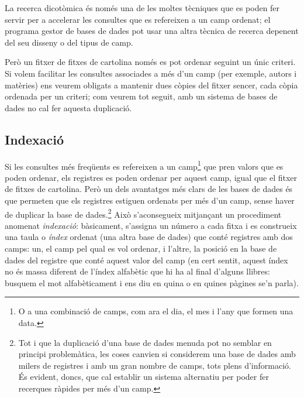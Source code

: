 La recerca dicotòmica és només una de les moltes tècniques que es
poden fer servir per a accelerar les consultes que es refereixen a un
camp ordenat; el programa gestor de bases de dades pot usar una altra
tècnica de recerca depenent del seu disseny o del tipus de camp.

Però un fitxer de fitxes de cartolina només es pot ordenar seguint un
únic criteri. Si volem facilitar les consultes associades a més d'un
camp (per exemple, autors i matèries) ens veurem obligats a mantenir
dues còpies del fitxer sencer, cada còpia ordenada per un criteri; com
veurem tot seguit, amb un sistema de bases de dades no cal fer aquesta
duplicació.

\subsection{Indexació}

Si les consultes més freqüents es refereixen a un camp\footnote{O a
  una combinació de camps, com ara el dia, el mes i l'any que formen
  una data.} que pren valors que es poden ordenar, els registres es
poden ordenar per aquest camp, igual que el fitxer de fitxes de
cartolina. Però un dels avantatges més clars de les bases de dades és
que permeten que els registres estiguen ordenats per més d'un camp,
sense haver de duplicar la base de dades.\footnote{
  
  Tot i que la duplicació d'una 
  base de dades menuda pot no semblar en principi problemàtica,
  les coses canvien si considerem una base de dades amb milers de
  registres i amb un gran nombre de camps, tots plens d'informació. 
  És evident, doncs, que cal establir un sistema alternatiu per poder
  fer recerques ràpides per més d'un camp.
  
} Això s'aconsegueix
mitjançant un procediment anomenat \emph{indexació}: bàsicament,
s'assigna un número a cada fitxa i es construeix una taula o
\emph{índex} ordenat (una altra base de dades) que conté registres amb
dos camps: un, el camp pel qual es vol ordenar, i l'altre, la posició
en la base de dades del registre que conté aquest valor del camp (en
cert sentit, aquest índex no és massa diferent de l'índex alfabètic
que hi ha al final d'alguns llibres: busquem el mot alfabèticament i
ens diu en quina o en quines pàgines se'n parla).

